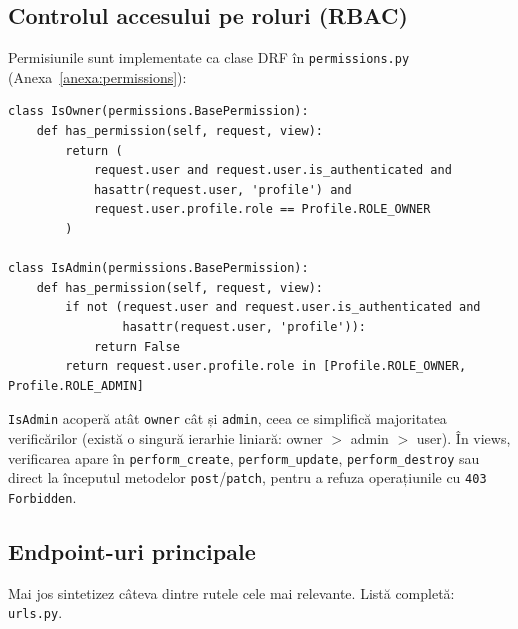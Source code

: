 \subsection{Controlul accesului pe roluri (RBAC)}
Permisiunile sunt implementate ca clase DRF în \texttt{permissions.py} (Anexa~\ref{anexa:permissions}):
\begin{verbatim}
class IsOwner(permissions.BasePermission):
    def has_permission(self, request, view):
        return (
            request.user and request.user.is_authenticated and
            hasattr(request.user, 'profile') and
            request.user.profile.role == Profile.ROLE_OWNER
        )

class IsAdmin(permissions.BasePermission):
    def has_permission(self, request, view):
        if not (request.user and request.user.is_authenticated and
                hasattr(request.user, 'profile')):
            return False
        return request.user.profile.role in [Profile.ROLE_OWNER, Profile.ROLE_ADMIN]
\end{verbatim}
\texttt{IsAdmin} acoperă atât \texttt{owner} cât și \texttt{admin}, ceea ce simplifică majoritatea verificărilor (există o singură ierarhie liniară: owner $>$ admin $>$ user). În views, verificarea apare în \texttt{perform\_create}, \texttt{perform\_update}, \texttt{perform\_destroy} sau direct la începutul metodelor \texttt{post}/\texttt{patch}, pentru a refuza operațiunile cu \texttt{403 Forbidden}.

\subsection{Endpoint-uri principale}
Mai jos sintetizez câteva dintre rutele cele mai relevante. Listă completă: \texttt{urls.py}.

